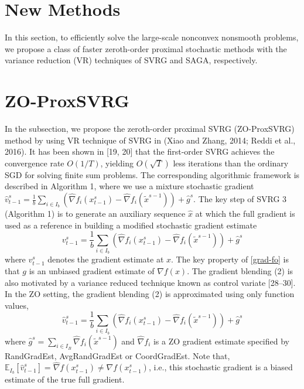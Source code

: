 \documentclass{article}
\newcommand*{\E}{\mathbb{E}}
\theoremstyle{definition}
\theoremstyle{remark}
\begin{document}
\section{New Methods}
{\color{Green}
In this section, to efficiently solve the large-scale nonconvex nonsmooth problems, we propose a class of faster zeroth-order proximal stochastic methods with the variance reduction (VR) techniques of SVRG and SAGA, respectively.}
\section{ZO-ProxSVRG}
{\color{Green}
In the subsection, we propose the zeroth-order proximal SVRG (ZO-ProxSVRG) method by using VR technique of SVRG in (Xiao and Zhang, 2014; Reddi et al., 2016).
{\color{Brown}It has been shown in [19, 20] that the first-order SVRG achieves the convergence rate $O(1/T )$, yielding $O(\sqrt{T})$ less iterations than the ordinary SGD for solving finite sum problems.}
{\color{Green}
The corresponding algorithmic framework is described in Algorithm 1, where we use a mixture stochastic gradient ${\hat{v}}_{t-1}^s = \frac{1}{b} \sum_{i\in I_b}\left(\hat{\nabla} f_{i}(x_{t-1}^s)-\hat{\nabla} f_{i}(\tilde{x}^{s-1})\right)+\hat{g}^s$. 
{\color{Brown} The key step of SVRG 3 (Algorithm 1) is to generate an auxiliary sequence $\hat{x}$ at which the full gradient is used as a reference in building a modified stochastic gradient estimate 
\begin{equation}\label{grad-fo}
{{v}}_{t-1}^s = \frac{1}{b} \sum_{i\in I_b}\left(\hat{\nabla} f_{i}(x_{t-1}^s)-\hat{\nabla} f_{i}(\tilde{x}^{s-1})\right)+\hat{g}^s
\end{equation}
where ${{v}}_{t-1}^s$ denotes the gradient estimate at $x$. The key property of \eqref{grad-fo} is that $g$ is an unbiased gradient estimate of $\nabla f(x)$. The gradient blending (2) is also motivated by a variance reduced technique
known as control variate [28–30]. 
In the ZO setting, the gradient blending (2) is approximated using only function values,
\begin{equation}
{\hat{v}}_{t-1}^s = \frac{1}{b} \sum_{i\in I_b}\left(\hat{\nabla} f_{i}(x_{t-1}^s)-\hat{\nabla} f_{i}(\tilde{x}^{s-1})\right)+\hat{g}^s
\end{equation}
where $\hat{g}^s= \sum_{i\in I_B}\hat{\nabla} f_{i}(\tilde{x}^{s-1})$ and $\hat{\nabla} f_{i}$ is a ZO gradient estimate specified by RandGradEst, AvgRandGradEst or CoordGradEst.
}
Note that, $\E_{I_b}[\hat{v}_{t-1}^s] = \hat{\nabla} f(x_{t-1}^s) \neq {\nabla} f(x_{t-1}^s)$, i.e., this stochastic gradient is a biased estimate of the true full gradient.
}}
\end{document}
